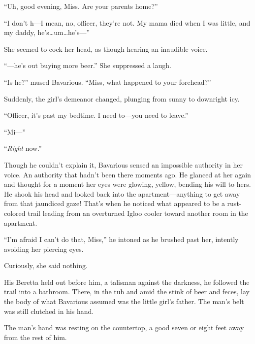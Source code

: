 ``Uh, good evening, Miss. Are your parents home?''



``I don't h---I mean, no, officer, they're not. My mama died
when I was little, and my daddy, he's{\ldots}um{\ldots}he's---''



She seemed to cock her head, as though hearing an inaudible
voice.



``---he's out buying more beer.'' She suppressed a laugh.



``Is he?'' mused Bavarious. ``Miss, what happened to your
forehead?''



Suddenly, the girl's demeanor changed, plunging from sunny to
downright icy.



``Officer, it's past my bedtime. I need to---you need to
leave.''



``Mi---''



``{\em Right} now.''



Though he couldn't explain it, Bavarious sensed an impossible
authority in her voice. An authority that hadn't been there moments
ago. He glanced at her again and thought for a moment her eyes were
glowing, yellow, bending his will to hers. He shook his head and
looked back into the apartment---anything to get away from that
jaundiced gaze! That's when he noticed what appeared to be a
rust-colored trail leading from an overturned Igloo cooler toward
another room in the apartment.



``I'm afraid I can't do that, Miss,'' he intoned as he brushed past
her, intently avoiding her piercing eyes.



Curiously, she said nothing.



His Beretta held out before him, a talisman against the darkness,
he followed the trail into a bathroom. There, in the tub and amid
the stink of beer and feces, lay the body of what Bavarious assumed
was the little girl's father. The man's belt was still clutched in
his hand.



The man's hand was resting on the countertop, a good seven or eight
feet away from the rest of him.



